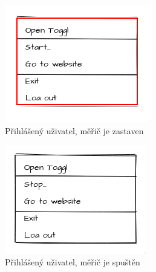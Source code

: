 \documentclass[thesis=B,czech]{FITthesis}[2012/06/26]
\begin{document}
\begin{figure}[!tbp]
\begin{subfigure}[h]{0.4\linewidth}
	\includegraphics[width=\linewidth]{wf_hm1.png}
	\caption{Přihlášený uživatel, měřič je zastaven}
\end{subfigure}
\hfill
\begin{subfigure}[h]{0.4\linewidth}
	\includegraphics[width=\linewidth]{wf_hm2.png}
	\caption{Přihlášený uživatel, měřič je spuštěn}
\end{subfigure} \par\medskip \centering
\begin{subfigure}[h]{0.4\linewidth}\centering

\end{subfigure}
\end{figure}
\end{document}

